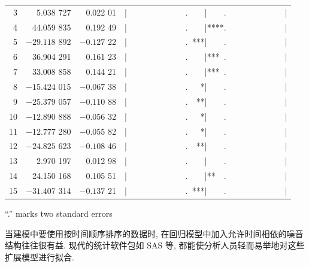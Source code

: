 

\begin{mvframe}
{\ttfamily\small
\begin{tabular}{@{}rrrl@{}}
3&5.038 727&0.022 01&|\ \ \ \ \ \ \ \ \ \ \ \ \ \ .\ \ \ \ |\ \ \ \ .\ \ \ \ \ \ \ \ \ \ \ \ \ \ |\\
4&44.059 835&0.192 49&|\ \ \ \ \ \ \ \ \ \ \ \ \ \ .\ \ \ \ |****.\ \ \ \ \ \ \ \ \ \ \ \ \ \ |\\
5&$-29.118$ 892&$-0.127$ 22&|\ \ \ \ \ \ \ \ \ \ \ \ \ \ .\ ***|\ \ \ \ .\ \ \ \ \ \ \ \ \ \ \ \ \ \ |\\
6&36.904 291&0.161 23&|\ \ \ \ \ \ \ \ \ \ \ \ \ \ .\ \ \ \ |***\ .\ \ \ \ \ \ \ \ \ \ \ \ \ \ |\\
7&33.008 858&0.144 21&|\ \ \ \ \ \ \ \ \ \ \ \ \ \ .\ \ \ \ |***\ .\ \ \ \ \ \ \ \ \ \ \ \ \ \ |\\
8&$-15.424$ 015&$-0.067$ 38&|\ \ \ \ \ \ \ \ \ \ \ \ \ \ .\ \ \ *|\ \ \ \ .\ \ \ \ \ \ \ \ \ \ \ \ \ \ |\\
9&$-25.379$ 057&$-0.110$ 88&|\ \ \ \ \ \ \ \ \ \ \ \ \ \ .\ \ **|\ \ \ \ .\ \ \ \ \ \ \ \ \ \ \ \ \ \ |\\
10&$-12.890$ 888&$-0.056$ 32&|\ \ \ \ \ \ \ \ \ \ \ \ \ \ .\ \ \ *|\ \ \ \ .\ \ \ \ \ \ \ \ \ \ \ \ \ \ |\\
11&$-12.777$ 280&$-0.055$ 82&|\ \ \ \ \ \ \ \ \ \ \ \ \ \ .\ \ \ *|\ \ \ \ .\ \ \ \ \ \ \ \ \ \ \ \ \ \ |\\
12&$-24.825$ 623&$-0.108$ 46&|\ \ \ \ \ \ \ \ \ \ \ \ \ \ .\ \ **|\ \ \ \ .\ \ \ \ \ \ \ \ \ \ \ \ \ \ |\\
13&2.970 197&0.012 98&|\ \ \ \ \ \ \ \ \ \ \ \ \ \ .\ \ \ \ |\ \ \ \ .\ \ \ \ \ \ \ \ \ \ \ \ \ \ |\\
14&24.150 168&0.105 51&|\ \ \ \ \ \ \ \ \ \ \ \ \ \ .\ \ \ \ |**\ \ .\ \ \ \ \ \ \ \ \ \ \ \ \ \ |\\
15&$-31.407$ 314&$-0.137$ 21&|\ \ \ \ \ \ \ \ \ \ \ \ \ \ .\ ***|\ \ \ \ .\ \ \ \ \ \ \ \ \ \ \ \ \ \ |\\
\end{tabular}
\par\vspace{10pt}
{\centering ``.'' marks two standard errors\par}
\par}
\end{mvframe}

当建模中要使用按时间顺序排序的数据时, 在回归模型中加入允许时间相依的噪音结构往往很有益. 现代的统计软件包如 SAS 等, 都能使分析人员轻而易举地对这些扩展模型进行拟合.


